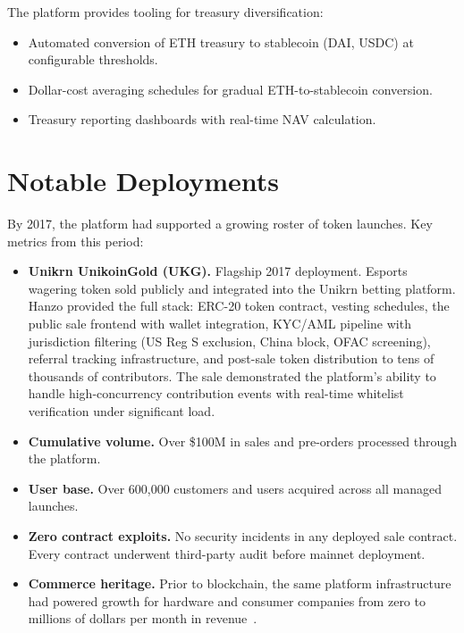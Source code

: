 \documentclass[11pt,letterpaper]{article}
\begin{document}
The platform provides tooling for treasury diversification:

\begin{itemize}[leftmargin=1.2em]
    \item Automated conversion of ETH treasury to stablecoin (DAI, USDC) at
    configurable thresholds.
    \item Dollar-cost averaging schedules for gradual ETH-to-stablecoin
    conversion.
    \item Treasury reporting dashboards with real-time NAV calculation.
\end{itemize}

\section{Notable Deployments}
\label{sec:deployments}

By 2017, the platform had supported a growing roster of token launches. Key
metrics from this period:

\begin{itemize}[leftmargin=1.2em]
    \item \textbf{Unikrn UnikoinGold (UKG).} Flagship 2017 deployment. Esports
    wagering token sold publicly and integrated into the Unikrn betting
    platform. Hanzo provided the full stack: ERC-20 token contract, vesting
    schedules, the public sale frontend with wallet integration, KYC/AML
    pipeline with jurisdiction filtering (US Reg S exclusion, China block,
    OFAC screening), referral tracking infrastructure, and post-sale token
    distribution to tens of thousands of contributors. The sale demonstrated
    the platform's ability to handle high-concurrency contribution events with
    real-time whitelist verification under significant load.
    \item \textbf{Cumulative volume.} Over \$100M in sales and pre-orders
    processed through the platform.
    \item \textbf{User base.} Over 600,000 customers and users acquired across
    all managed launches.
    \item \textbf{Zero contract exploits.} No security incidents in any
    deployed sale contract. Every contract underwent third-party audit before
    mainnet deployment.
    \item \textbf{Commerce heritage.} Prior to blockchain, the same platform
    infrastructure had powered growth for hardware and consumer companies from
    zero to millions of dollars per month in revenue~\cite{crowdstart2014}.
\end{itemize}
\end{document}
